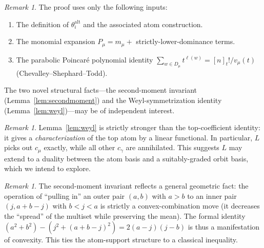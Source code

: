 \documentclass[11pt]{article}
\theoremstyle{definition}
\theoremstyle{remark}
\newtheorem{remark}[theorem]{Remark}
\newcommand{\thetaalt}{\theta^{\mathrm{alt}}}
\begin{document}
\begin{remark}
The proof uses only the following inputs:
\begin{enumerate}\itemsep=0pt
\item The definition of $\thetaalt_i$ and the associated atom construction.
\item The monomial expansion $P_\mu = m_\mu + $ strictly-lower-dominance terms.
\item The parabolic Poincar\'e polynomial identity
      $\sum_{w \in D_\mu} t^{\ell(w)} = [n]_t!/v_\mu(t)$ (Chevalley--Shephard--Todd).
\end{enumerate}
The two novel structural facts---the second-moment invariant
(Lemma~\ref{lem:secondmoment}) and the Weyl-symmetrization identity
(Lemma~\ref{lem:weyl})---may be of independent interest.
\end{remark}

\begin{remark}
Lemma~\ref{lem:weyl} is strictly stronger than the top-coefficient identity:
it gives a \emph{characterization} of the top atom by a linear functional. In
particular, $L$ picks out $c_\mu$ exactly, while all other $c_\gamma$ are
annihilated. This suggests $L$ may extend to a duality between the atom basis
and a suitably-graded orbit basis, which we intend to explore.
\end{remark}

\begin{remark}
The second-moment invariant reflects a general geometric fact: the operation
of ``pulling in'' an outer pair $(a,b)$ with $a>b$ to an inner pair $(j, a+b-j)$
with $b<j<a$ is strictly a convex-combination move (it decreases the ``spread''
of the multiset while preserving the mean). The formal identity
$(a^2+b^2) - (j^2 + (a+b-j)^2) = 2(a-j)(j-b)$
is thus a manifestation of convexity. This ties the atom-support structure to
a classical inequality.
\end{remark}
\end{document}
